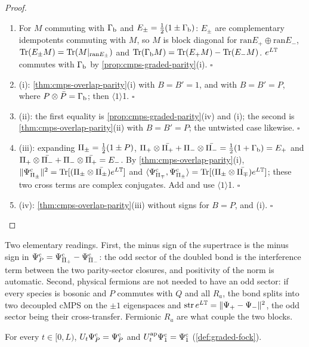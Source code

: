 \begin{proof}
\begin{enumerate}
\item[$\langle1\rangle$1.] For $M$ commuting with $\Gamma_{\mathrm b}$ and $E_\pm=\tfrac12(1\pm\Gamma_{\mathrm b})$:
$E_\pm$ are complementary idempotents commuting with $M$, so $M$ is block diagonal for
$\mathrm{ran}E_+\oplus\mathrm{ran}E_-$, $\operatorname{Tr}(E_\pm M)=\operatorname{Tr}(M|_{\mathrm{ran}E_\pm})$ and
$\operatorname{Tr}(\Gamma_{\mathrm b} M)=\operatorname{Tr}(E_+M)-\operatorname{Tr}(E_-M)$. $e^{L\mathbb T}$ commutes with $\Gamma_{\mathrm b}$ by
\cref{prop:cmps-graded-parity}(i). $\square$
\item[$\langle1\rangle$2.] (i): \cref{thm:cmps-overlap-parity}(i) with $B=B'=1$, and with
$B=B'=P$, where $P\otimes\bar P=\Gamma_{\mathrm b}$; then $\langle1\rangle$1. $\square$
\item[$\langle1\rangle$3.] (ii): the first equality is \cref{prop:cmps-graded-parity}(iv) and (i);
the second is \cref{thm:cmps-overlap-parity}(ii) with $B=B'=P$; the untwisted case likewise.
$\square$
\item[$\langle1\rangle$4.] (iii): expanding $\Pi_{\pm}=\tfrac12(1\pm P)$,
$\Pi_{+}\otimes\bar{\Pi_{+}}+\Pi_{-}\otimes\bar{\Pi_{-}}=\tfrac12(1+\Gamma_{\mathrm b})=E_+$ and
$\Pi_{+}\otimes\bar{\Pi_{-}}+\Pi_{-}\otimes\bar{\Pi_{+}}=E_-$. By
\cref{thm:cmps-overlap-parity}(i), $\|\Psi^{\mathrm c}_{\Pi_{\pm}}\|^2=\operatorname{Tr}[(\Pi_{\pm}\otimes
\bar{\Pi_{\pm}})e^{L\mathbb T}]$ and $\langle\Psi^{\mathrm c}_{\Pi_{\mp}},\Psi^{\mathrm c}_{\Pi_{\pm}}\rangle=
\operatorname{Tr}[(\Pi_{\pm}\otimes\bar{\Pi_{\mp}})e^{L\mathbb T}]$; these two cross terms are complex
conjugates. Add and use $\langle1\rangle$1. $\square$
\item[$\langle1\rangle$5.] (iv): \cref{thm:cmps-overlap-parity}(iii) without signs for $B=P$,
and (i). $\square$
\end{enumerate}
\end{proof}

Two elementary readings. First, the minus sign of the supertrace is the minus sign in
$\Psi^{\mathrm c}_{P}=\Psi^{\mathrm c}_{\Pi_{+}}-\Psi^{\mathrm c}_{\Pi_{-}}$: the odd sector of the doubled bond is the
interference term between the two parity-sector closures, and positivity of the norm is
automatic. Second, physical fermions are not needed to have an odd sector: if every species is
bosonic and $P$ commutes with $Q$ and all $R_a$, the bond splits into two decoupled cMPS on
the $\pm1$ eigenspaces and $\operatorname{str} e^{L\mathbb T}=\|\Psi_+-\Psi_-\|^2$, the odd sector being their
cross-transfer. Fermionic $R_a$ are what couple the two blocks.

\begin{proposition}
\label{prop:cmps-twist-translation}
For every $t\in[0,L)$, $U_t\Psi^{\mathrm c}_{P}=\Psi^{\mathrm c}_{P}$ and $U^{\mathrm{ap}}_t\Psi^{\mathrm c}_{1}=\Psi^{\mathrm c}_{1}$
(\cref{def:graded-fock}).
\end{proposition}

